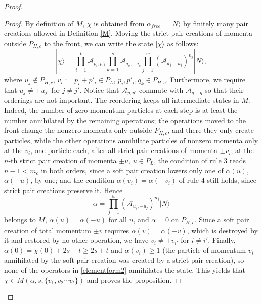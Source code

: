 \documentclass[11pt]{article}
\numberwithin{equation}{section}
\newcommand{\beq}{\begin{equation}}
\newcommand{\eeq}{\end{equation}}
\newcommand\al{{\alpha}}
\theoremstyle{definition}
\begin{document}
\begin{proof}
\begin{proof}
By definition of $M$, $\chi$ is obtained from $\al_{free}=|N\rangle$ by finitely many pair creations allowed in Definition \ref{M}. Moving the strict pair creations of momenta outside $P_{H,c}$ to the front, we can write the state $|\chi\rangle$ as follows:
\beq\label{temp8.164}
|\chi\rangle=\prod_{i=1}^{t}\mathcal A_{p_i,p'_i}  \prod_{k=1}^{s}\mathcal A_{q_k,-q_k} \prod_{j=1}^w(
\mathcal A_{u_j, -u_{j}})^{n_j}|N\rangle, 
\eeq
where $u_j\notin P_{H,c}$, $v_i:= p_i+p'_i \in P_L$, $p_i, p'_i, q_k\in P_{H,c}$. Furthermore, we require that 
$u_j\neq \pm u_{j'}$ for $ j \not= j'$. Notice that 
$\mathcal A_{p, p'}$ commute with $\mathcal A_{q, -q}$  so that their orderings are not important. 
The reordering keeps all intermediate states in $M$. Indeed, the number of zero momentum particles at each step is at least the number annihilated by the remaining operations; the operations moved to the front change the nonzero momenta only outside $P_{H,c}$, and there they only create particles, while the other operations annihilate particles of nonzero momenta only at the $v_i$, one particle each, after all strict pair creations of momenta $\pm v_i$; at the $n$-th strict pair creation of momenta $\pm u$, $u\in P_L$, the condition of rule 3 reads $n-1<m_c$ in both orders, since a soft pair creation lowers only one of $\al(u)$, $\al(-u)$, by one; and the condition $\al(v_i)=\al(-v_i)$ of rule 4 still holds, since strict pair creations preserve it. 
Hence 
\beq
\al=\prod_{j=1}^w(\mathcal A_{u_j,-u_j})^{n_j}|N\rangle
\eeq
belongs to $M$, $\al(u)=\al(-u)$ for all $u$, and $\al=0$ on $P_{H,c}$. Since a soft pair creation of total momentum $\pm v$ requires $\al(v)=\al(-v)$, which is destroyed by it and restored by no other operation, we have $v_i\neq \pm v_{i'}$ for $i \not = i'$. Finally, $\al(0)=\chi(0)+2s+t\geq 2s+t$ and $\al(v_i)\geq 1$ (the particle of momentum $v_i$ annihilated by the soft pair creation was created by a strict pair creation), so none of the operators in \eqref{elementform2} annihilates the state. 
This yields that $\chi\in M(\al, s, \{v_1,v_2\cdots v_t\})$ and proves the proposition. 
\end{proof}
%




\end{proof}
\end{document}
